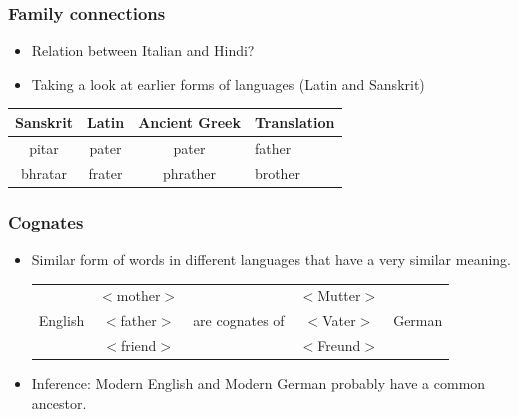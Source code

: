 \documentclass[12pt, table]{beamer}
\begin{document}
\begin{frame}
\frametitle{Family connections}
\begin{itemize}
\item Relation between Italian and Hindi?
\item Taking a look at earlier forms of languages (Latin and Sanskrit)
\end{itemize}
\begin{tabularx}{\textwidth}{cccY}
\hline
\textbf{Sanskrit} & \textbf{Latin} & \textbf{Ancient Greek} & \textbf{Translation} \\
\hline
pitar & pater & pater & father\\
bhratar & frater & phrather & brother\\
\hline
\end{tabularx}
\end{frame}

\begin{frame}
\frametitle{Cognates}
\begin{itemize}
\item Similar form of words in different languages that have a very similar meaning.\\[.5cm]
\begin{tabularx}{\textwidth}{ccccc}
\multirow{3}{*}{English} & $<$mother$>$ & \multirow{3}{*}{\tiny{are cognates of}} & $<$Mutter$>$ & \multirow{3}{*}{German}\\
& $<$father$>$ & & $<$Vater$>$ & \\
& $<$friend$>$ & & $<$Freund$>$ & \\[.5cm]
\end{tabularx}
\item Inference: Modern English and Modern German probably have a common ancestor.	
\end{itemize}
\end{frame}
\end{document}
